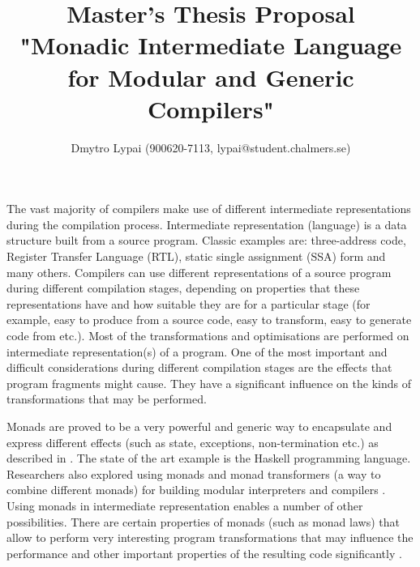 \documentclass{article}
\title{Master's Thesis Proposal\\ "Monadic Intermediate Language for Modular and Generic Compilers"}
\author{Dmytro Lypai (900620-7113, lypai@student.chalmers.se)}
\begin{document}
\maketitle

The vast majority of compilers make use of different intermediate representations during the compilation process.
Intermediate representation (language) is a data structure built from a source program.
Classic examples are: three-address code, Register Transfer Language (RTL), static single assignment (SSA) form and many others.
Compilers can use different representations of a source program during different compilation stages, depending on properties that
these representations have and how suitable they are for a particular stage (for example, easy to produce from a source code,
easy to transform, easy to generate code from etc.).
Most of the transformations and optimisations are performed on intermediate representation(s) of a program.
One of the most important and difficult considerations during different compilation stages are the effects that program fragments
might cause. They have a significant influence on the kinds of transformations that may be performed.

Monads are proved to be a very powerful and generic way to encapsulate and express different effects
(such as state, exceptions, non-termination etc.) as described in \cite{MonadsAndEffects, MonadsForFP}.
The state of the art example is the Haskell programming language.
Researchers also explored using monads and monad transformers (a way to combine different monads)
for building modular interpreters and compilers \cite{MTandMI, MDSforCC, MConMT}.
Using monads in intermediate representation enables a number of other possibilities.
There are certain properties of monads (such as monad laws) that allow to perform very interesting program transformations
that may influence the performance and other important properties of the resulting code significantly \cite{MonadsEffectsAndTrans, OptML}.
\end{document}
